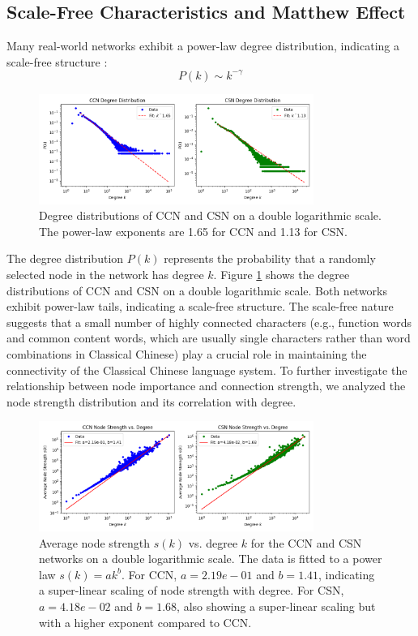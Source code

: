 \documentclass[11pt]{article}
\begin{document}
\subsection{Scale-Free Characteristics and Matthew Effect}
Many real-world networks exhibit a power-law degree distribution, indicating a scale-free structure \cite{Barabasi1999}:
\begin{equation}
P(k) \sim k^{-\gamma}
\end{equation}
\begin{figure}[htbp]
    \centering
    \includegraphics[width=0.8\textwidth]{../analysis/degree distribution/degree distribution.png}
    \caption{Degree distributions of CCN and CSN on a double logarithmic scale. The power-law exponents are 1.65 for CCN and 1.13 for CSN.}
    \label{fig:degree_dist}
    \end{figure}
    The degree distribution $P(k)$ represents the probability that a randomly selected node in the network has degree $k$. Figure \ref{fig:degree_dist} shows the degree distributions of CCN and CSN on a double logarithmic scale. Both networks exhibit power-law tails, indicating a scale-free structure.
    The scale-free nature suggests that a small number of highly connected characters (e.g., function words and common content words, which are usually single characters rather than word combinations in Classical Chinese) play a crucial role in maintaining the connectivity of the Classical Chinese language system.
    To further investigate the relationship between node importance and connection strength, we analyzed the node strength distribution and its correlation with degree.
\begin{figure}[htbp]
    \centering
    \includegraphics[width=0.8\textwidth]{../analysis/node strength/node strenth.png}
    \caption{Average node strength $s(k)$ vs. degree $k$ for the CCN and CSN networks on a double logarithmic scale. The data is fitted to a power law $s(k) = ak^b$. For CCN, $a=2.19e-01$ and $b=1.41$, indicating a super-linear scaling of node strength with degree. For CSN, $a=4.18e-02$ and $b=1.68$, also showing a super-linear scaling but with a higher exponent compared to CCN.}
    \label{fig:strength_dist}
    \end{figure}
\end{document}
